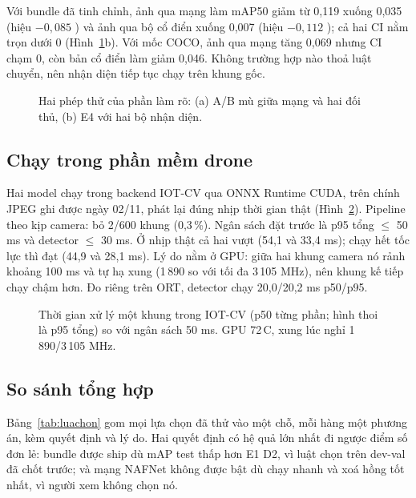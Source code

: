 \sloppy Với bundle đã tinh chỉnh, ảnh qua mạng làm mAP50 giảm từ 0,119 xuống 0,035 (hiệu $-0{,}085$ ) và ảnh qua bộ cổ điển xuống 0,007 (hiệu $-0{,}112$ ); cả hai CI nằm trọn dưới 0 (Hình~\ref{fig:ab-e4}b). Với mốc COCO, ảnh qua mạng tăng 0,069 nhưng CI  chạm 0, còn bản cổ điển làm giảm 0,046. Không trường hợp nào thoả luật chuyển, nên nhận diện tiếp tục chạy trên khung gốc.\par\fussy

\begin{figure}[!htbp]
\centering

\caption{Hai phép thử của phần làm rõ: (a) A/B mù giữa mạng và hai đối thủ, (b) E4 với hai bộ nhận diện.}
\label{fig:ab-e4}
\end{figure}

\subsection{Chạy trong phần mềm drone}

Hai model chạy trong backend IOT-CV qua ONNX Runtime CUDA, trên chính JPEG ghi được ngày 02/11, phát lại đúng nhịp thời gian thật (Hình~\ref{fig:latency}). Pipeline theo kịp camera: bỏ 2/600 khung (0,3\,\%). Ngân sách đặt trước là p95 tổng $\leq$ 50 ms và detector $\leq$ 30 ms. Ở nhịp thật cả hai vượt (54,1 và 33,4 ms); chạy hết tốc lực thì đạt (44,9 và 28,1 ms). Lý do nằm ở GPU: giữa hai khung camera nó rảnh khoảng 100 ms và tự hạ xung (1\,890 so với tối đa 3\,105 MHz), nên khung kế tiếp chạy chậm hơn. Đo riêng trên ORT, detector chạy 20,0/20,2 ms p50/p95.

\begin{figure}[!htbp]
\centering

\caption[Thời gian xử lý một khung trong IOT-CV (p50 từng phần; hình thoi là p95 tổng) so với ngân sách 50 ms]{Thời gian xử lý một khung trong IOT-CV (p50 từng phần; hình thoi là p95 tổng) so với ngân sách 50 ms. GPU 72\,\textdegree C, xung lúc nghỉ 1\,890/3\,105 MHz.}
\label{fig:latency}
\end{figure}



\subsection{So sánh tổng hợp}\label{sec:so-sanh}

Bảng~\ref{tab:luachon} gom mọi lựa chọn đã thử vào một chỗ, mỗi hàng một phương án, kèm quyết định và lý do. Hai quyết định có hệ quả lớn nhất đi ngược điểm số đơn lẻ: bundle được ship dù mAP test thấp hơn E1 D2, vì luật chọn trên dev-val đã chốt trước; và mạng NAFNet không được bật dù chạy nhanh và xoá hồng tốt nhất, vì người xem không chọn nó.

